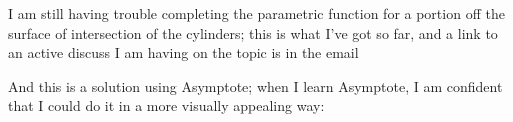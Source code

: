 \documentclass{article}
\begin{document}
\vspace{10pt}

I am still having trouble completing the parametric function for a portion off  the surface of intersection of the cylinders; this is what I've got so far, and a link to an active discuss I am having on the topic is in the email

\begin{center}
\end{center}

\newpage

And this is a solution using Asymptote; when I learn Asymptote, I am confident that I could do it in a more visually appealing way:
\begin{comment}
\begin{center}
\begin{asy}
  import graph3;
  import solids;

  size(0,150);
  currentprojection=orthographic(1,1/2,1/2);

  // usage revolution r = cylinder(start,radius,length,ax);
  revolution r=cylinder(O,1,8,X);
  draw(surface(r),gray,render(merge=true));
  revolution r=cylinder((4,-4,0),1,8,Y);
  draw(surface(r),gray(0.8),render(merge=true));
 \end{asy}

 \begin{asy}
  import graph3;
  import solids;

  size(0,150);
  currentprojection=orthographic(1,1/2,1/2);

  // usage revolution r = cylinder(start,radius,length,ax);
  revolution r=cylinder(O,1,8,X);
  draw(surface(r),gray,render(merge=true));
  revolution r=cylinder((4,0,0),1,4,Y);
  draw(surface(r),gray(0.8),render(merge=true));
  draw((3.5,-1,1) -- (0,-1,1),  arrow=Arrow3(TeXHead2));
  draw((4.5,-1,1) -- (8,-1,1),  arrow=Arrow3(TeXHead2));
  label("$L_1$",(4,-1,1));
 \end{asy}
\end{center}
\end{comment}
\end{document}

